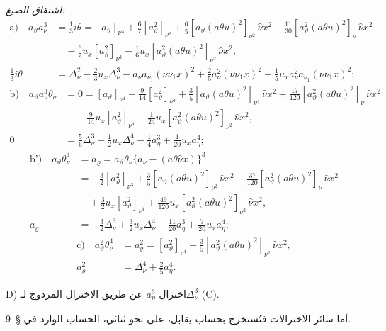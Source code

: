\documentclass[11pt]{article}
\providecommand{\A}{\Delta}
\providecommand{\R}{\varrho}
\begin{document}
\noindent\emph{اشتقاق الصيغ:}
\[
\begin{aligned}
\text{a)}\quad
 a_\vartheta a_\nu^3
&=\frac13 i\theta
=[a_\vartheta]_{\nu^3}+\frac67[a_\vartheta^2]_{\nu^2}
+\frac65[a_\vartheta(a\theta u)^2]_{\nu^2}\,\widehat{\nu}x^2
+\frac{11}{30}[a_\vartheta^2(a\theta u)^2]_{\nu}\,\widehat{\nu}x^2\\
&\quad-\frac67u_x[a_\vartheta^2]_{\nu^3}
-\frac16u_x[a_\vartheta^2(a\theta u)^2]_{\nu^2}\,\widehat{\nu}x^2,\\
\frac13 i\theta
&=\A_\nu^2-\frac23u_x\A_\nu^3-a_\nu a_{\nu_1}(\nu\nu_1x)^2
+\frac25a_\nu^2(\nu\nu_1x)^2
+\frac15u_xa_\nu^2a_{\nu_1}(\nu\nu_1x)^2;
\end{aligned}
\]
\[
\begin{aligned}
\text{b)}\quad
 a_\vartheta a_\nu^3\theta_\nu
&=0=[a_\vartheta]_{\nu^4}+\frac9{14}[a_\vartheta^2]_{\nu^3}
+\frac35[a_\vartheta(a\theta u)^2]_{\nu^2}\,\widehat{\nu}x^2
+\frac{17}{120}[a_\vartheta^2(a\theta u)^2]_{\nu}\,\widehat{\nu}x^2\\
&\quad-\frac9{14}u_x[a_\vartheta^2]_{\nu^4}
-\frac1{24}u_x[a_\vartheta^2(a\theta u)^2]_{\nu^2}\,\widehat{\nu}x^2,\\
0&=\frac56\A_\nu^3-\frac12u_x\A_\nu^4-\frac14a_\eta^3+\frac1{20}u_xa_\eta^4;
\end{aligned}
\]
\[
\begin{aligned}
\text{b')}\quad
 a_\vartheta\theta_\nu^4
&=a_\R=a_\vartheta\theta_\nu\{a_\nu-(a\theta\widehat{\nu}x)\}^3\\
&=-\frac32[a_\vartheta^2]_{\nu^3}
+\frac35[a_\vartheta(a\theta u)^2]_{\nu^2}\,\widehat{\nu}x^2
-\frac{37}{120}[a_\vartheta^2(a\theta u)^2]_{\nu}\,\widehat{\nu}x^2\\
&\quad+\frac32u_x[a_\vartheta^2]_{\nu^4}
+\frac{49}{120}u_x[a_\vartheta^2(a\theta u)^2]_{\nu^2}\,\widehat{\nu}x^2,\\
a_\R&=-\frac32\A_\nu^3+\frac32u_x\A_\nu^4-\frac{11}{20}a_\eta^3+\frac7{20}u_xa_\eta^4;
\end{aligned}
\]
\[
\begin{aligned}
\text{c)}\quad
 a_\vartheta^2\theta_\nu^4
&=a_\R^2=[a_\vartheta^2]_{\nu^4}+\frac35[a_\vartheta^2(a\theta u)^2]_{\nu^2}\,\widehat{\nu}x^2,\\
a_\R^2&=\A_\nu^4+\frac25a_\eta^4.
\end{aligned}
\]

\noindent D) اختزال $a_\eta^3$ عن طريق الاختزال المزدوج لـ$\A_\nu^3$ (C).

أما سائر الاختزالات فتُستخرج بحساب يقابل، على نحو ثنائي، الحساب الوارد في \S\ 9.
\end{document}
